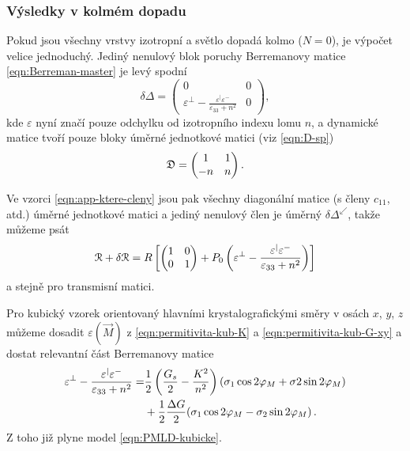 \subsubsection*{Výsledky v kolmém dopadu}

Pokud jsou všechny vrstvy izotropní a světlo dopadá kolmo ($N=0$), je výpočet velice jednoduchý.
Jediný nenulový blok poruchy Berremanovy matice \eqref{eqn:Berreman-master} je levý spodní
\begin{equation}
    \delta\Delta = \begin{pmatrix} 0 & 0\\
    \varepsilon^\perp - \frac{\varepsilon^\vert\varepsilon^-}{\varepsilon_{33}+n^2}& 0\end{pmatrix},
\end{equation}
kde $\varepsilon$ nyní značí pouze odchylku od izotropního indexu lomu $n$, a dynamické matice tvoří pouze bloky úměrné jednotkové matici (viz \eqref{eqn:D-sp})
\begin{equation}
    \mathfrak{D} = \begin{pmatrix} 1&1\\-n&n \end{pmatrix} .
\end{equation}

Ve vzorci \eqref{eqn:app-ktere-cleny} jsou pak všechny diagonální matice (s členy $c_{11}$, atd.) úměrné jednotkové matici a jediný nenulový člen je úměrný $\delta\Delta^\swarrow$, takže můžeme psát
\begin{equation}
    \mathcal{R} + \delta\mathcal{R} = R \left[ \begin{pmatrix} 1&0\\0&1 \end{pmatrix} + P_0 \left( \varepsilon^\perp - \frac{\varepsilon^\vert\varepsilon^-}{\varepsilon_{33}+n^2} \right) \right]
\end{equation}
a stejně pro transmisní matici.


Pro kubický vzorek orientovaný hlavními krystalografickými směry v osách $x$, $y$, $z$ můžeme dosadit $\varepsilon(\vec{M})$ z \eqref{eqn:permitivita-kub-K} a \eqref{eqn:permitivita-kub-G-xy} a dostat relevantní část Berremanovy matice
\begin{align}
    \varepsilon^\perp - \frac{\varepsilon^\vert\varepsilon^-}{\varepsilon_{33}+n^2} =& \frac{1}{2}\left( \frac{G_s}{2}-\frac{K^2}{n^2} \right) (\sigma_1\cos2\varphi_M + \sigma2\sin2\varphi_M) \\
                                                                                &+ \frac{1}{2}\frac{\Delta G}{2}(\sigma_1\cos2\varphi_M - \sigma_2 \sin2\varphi_M) \,.
\end{align}
Z toho již plyne model \eqref{eqn:PMLD-kubicke}.
